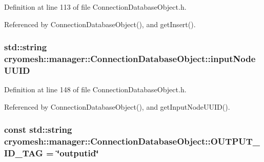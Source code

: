 \-Definition at line 113 of file \-Connection\-Database\-Object.\-h.



\-Referenced by \-Connection\-Database\-Object(), and get\-Insert().

\hypertarget{classcryomesh_1_1manager_1_1ConnectionDatabaseObject_a06774523f087375aaf58b69006b2943d}{
\subsubsection[{input\-Node\-U\-U\-I\-D}]{\setlength{\rightskip}{0pt plus 5cm}std\-::string {\bf cryomesh\-::manager\-::\-Connection\-Database\-Object\-::input\-Node\-U\-U\-I\-D}}}\label{classcryomesh_1_1manager_1_1ConnectionDatabaseObject_a06774523f087375aaf58b69006b2943d}


\-Definition at line 148 of file \-Connection\-Database\-Object.\-h.



\-Referenced by \-Connection\-Database\-Object(), and get\-Input\-Node\-U\-U\-I\-D().

\hypertarget{classcryomesh_1_1manager_1_1ConnectionDatabaseObject_ac0ee0b21e1f626b12b125987283f7ebb}{
\subsubsection[{\-O\-U\-T\-P\-U\-T\-\_\-\-I\-D\-\_\-\-T\-A\-G}]{\setlength{\rightskip}{0pt plus 5cm}const std\-::string {\bf cryomesh\-::manager\-::\-Connection\-Database\-Object\-::\-O\-U\-T\-P\-U\-T\-\_\-\-I\-D\-\_\-\-T\-A\-G} = \char`\"{}outputid\char`\"{}}}\label{classcryomesh_1_1manager_1_1ConnectionDatabaseObject_ac0ee0b21e1f626b12b125987283f7ebb}


